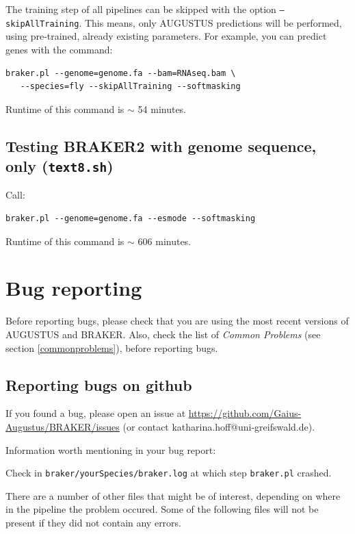 \documentclass[]{article}
\begin{document}
The training step of all pipelines can be skipped with the option
\texttt{–skipAllTraining}. This means, only AUGUSTUS predictions will be
performed, using pre-trained, already existing parameters. For example,
you can predict genes with the command:

\begin{verbatim}
braker.pl --genome=genome.fa --bam=RNAseq.bam \
   --species=fly --skipAllTraining --softmasking
\end{verbatim}

Runtime of this command is \(\sim\) 54 minutes.

\subsection{Testing BRAKER2 with genome sequence, only (\texttt{text8.sh})}\label{testing-braker2-with-genome-sequence-only-text8.sh}

Call:

\begin{verbatim}
braker.pl --genome=genome.fa --esmode --softmasking
\end{verbatim}

Runtime of this command is \(\sim\) 606 minutes.

\section{Bug reporting}\label{bug-reporting}

Before reporting bugs, please check that you are using the most recent
versions of AUGUSTUS and BRAKER. Also, check the list of \emph{Common
Problems} (see section \ref{commonproblems}), before reporting bugs.

\subsection{Reporting bugs on github}\label{reporting-bugs-on-github}

If you found a bug, please open an issue at
\url{https://github.com/Gaius-Augustus/BRAKER/issues} (or contact
katharina.hoff@uni-greifswald.de).

Information worth mentioning in your bug report:

Check in \texttt{braker/yourSpecies/braker.log} at which step
\texttt{braker.pl} crashed.

There are a number of other files that might be of interest, depending
on where in the pipeline the problem occured. Some of the following
files will not be present if they did not contain any errors.
\end{document}
